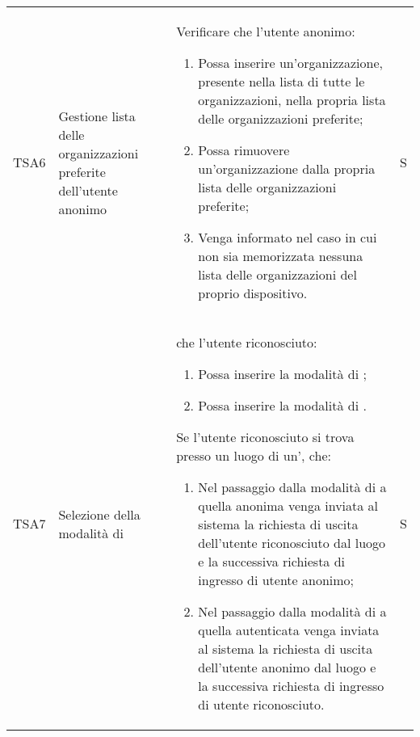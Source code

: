{\begin{longtable}{ c  C{2.5cm}  C{10cm} C{1cm}}
TSA6 & Gestione lista delle organizzazioni preferite dell'utente anonimo &
Verificare che l'utente anonimo:
\begin{enumerate}
    \item Possa inserire un'organizzazione, presente nella lista di tutte le organizzazioni, nella propria lista delle organizzazioni preferite;
    \item Possa rimuovere un'organizzazione dalla propria lista delle organizzazioni preferite;
    \item Venga informato nel caso in cui non sia memorizzata nessuna lista delle organizzazioni del proprio dispositivo.
\end{enumerate} & S \\

TSA7 & Selezione della modalità di  & 
 che l'utente riconosciuto:
\begin{enumerate}
    \item Possa inserire la modalità di ;
    \item Possa inserire la modalità di .
\end{enumerate}
Se l'utente riconosciuto si trova presso un luogo di un',  che:
\begin{enumerate}[resume]
    \item Nel passaggio dalla modalità di  a quella anonima venga inviata al sistema la richiesta di uscita dell'utente riconosciuto dal luogo e la successiva richiesta di ingresso di utente anonimo;
    \item Nel passaggio dalla modalità di  a quella autenticata venga inviata al sistema la richiesta di uscita dell'utente anonimo dal luogo e la successiva richiesta di ingresso di utente riconosciuto.
\end{enumerate} & S \\


\end{longtable}}
